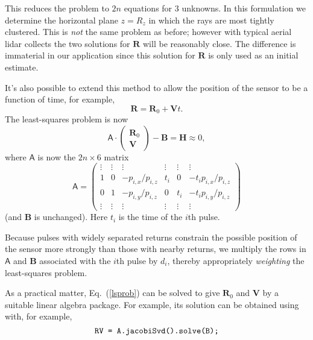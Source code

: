 \documentclass
[rmp,reprint,
twocolumn,amsmath,showkeys,letterpaper,raggedbottom]{revtex4-2}
\begin{document}
This reduces the problem to $2n$ equations for $3$ unknowns.  In this
formulation we determine the horizontal plane $z = R_z$ in which the
rays are most tightly clustered.  This is {\it not} the same problem as
before; however with typical aerial lidar collects the two solutions for
$\mathbf R$ will be reasonably close.  The difference is immaterial in
our application since this solution for $\mathbf R$ is only used as an
initial estimate.

It's also possible to extend this method to allow the position of the
sensor to be a function of time, for example,
\begin{equation*}
  \mathbf R = \mathbf R_0 + \mathbf V t.
\end{equation*}
The least-squares problem is now
\begin{equation}\label{lsprob}
\mathsf A \cdot
\begin{pmatrix}
  \mathbf R_0\\
  \mathbf V
\end{pmatrix}
- \mathbf B = \mathbf H \approx 0,
\end{equation}
where $\mathsf A$ is now the $2n \times 6$ matrix
\begin{equation}
\mathsf A = \begin{pmatrix}
\vdots & \vdots & \vdots & \vdots & \vdots & \vdots \\
1 & 0 & - p_{i,x}/p_{i,z} & t_i & 0   & - t_i p_{i,x}/p_{i,z} \\
0 & 1 & - p_{i,y}/p_{i,z} & 0   & t_i & - t_i p_{i,y}/p_{i,z}\\
\vdots & \vdots & \vdots & \vdots & \vdots & \vdots
\end{pmatrix}
\end{equation}
(and $\mathbf B$ is unchanged).  Here $t_i$ is the time of the $i$th
pulse.

Because pulses with widely separated returns constrain the possible
position of the sensor more strongly than those with nearby returns, we
multiply the rows in $\mathsf A$ and $\mathbf B$ associated with the
$i$th pulse by $d_i$, thereby appropriately {\it weighting} the
least-squares problem.

As a practical matter, Eq.~(\ref{lsprob}) can be solved to give $\mathbf
R_0$ and $\mathbf V$ by a suitable linear algebra package.  For example,
its solution can be obtained using \citet{eigen} with, for example,
\begin{equation*}
\text{\tt RV = A.jacobiSvd().solve(B);}
\end{equation*}
\end{document}
